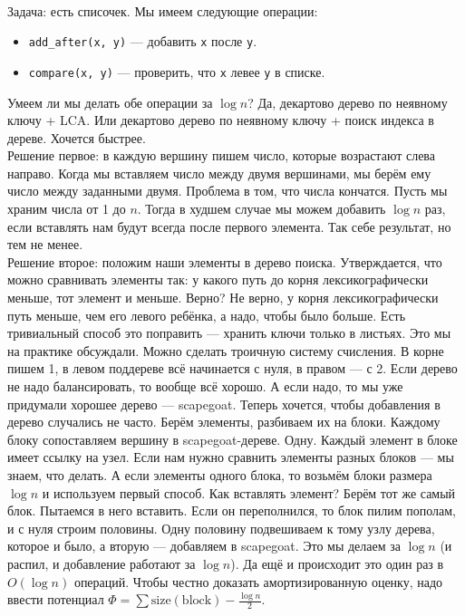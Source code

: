 \documentclass{article}
\newcommand{\pseudo}{PseudoLexer.py:PseudoLexer -x}
\newcommand{\pseudocode}[1]{\texttt{#1}}
\begin{document}
    \paragraph{}
    Задача: есть списочек. Мы имеем следующие операции:
    \begin{itemize}
        \item \pseudocode{add_after(x, y)} --- добавить \pseudocode{x} после \pseudocode{y}.
        \item \pseudocode{compare(x, y)} --- проверить, что \pseudocode{x} левее \pseudocode{y} в списке.
    \end{itemize}
    Умеем ли мы делать обе операции за $\log n$? Да, декартово дерево по неявному ключу + LCA. Или декартово дерево по неявному ключу + поиск индекса в дереве. Хочется быстрее.\\
    Решение первое: в каждую вершину пишем число, которые возрастают слева направо. Когда мы вставляем число между двумя вершинами, мы берём ему число между заданными двумя. Проблема в том, что числа кончатся. Пусть мы храним числа от 1 до $n$. Тогда в худшем случае мы можем добавить $\log n$ раз, если вставлять нам будут всегда после первого элемента. Так себе результат, но тем не менее.\\
    Решение второе: положим наши элементы в дерево поиска. Утверждается, что можно сравнивать элементы так: у какого путь до корня лексикографически меньше, тот элемент и меньше. Верно? Не верно, у корня лексикографически путь меньше, чем его левого ребёнка, а надо, чтобы было больше. Есть тривиальный способ это поправить --- хранить ключи только в листьях. Это мы на практике обсуждали. Можно сделать троичную систему счисления. В корне пишем 1, в левом поддереве всё начинается с нуля, в правом --- с 2. Если дерево не надо балансировать, то вообще всё хорошо. А если надо, то мы уже придумали хорошее дерево --- scapegoat. Теперь хочется, чтобы добавления в дерево случались не часто. Берём элементы, разбиваем их на блоки. Каждому блоку сопоставляем вершину в scapegoat-дереве. Одну. Каждый элемент в блоке имеет ссылку на узел. Если нам нужно сравнить элементы разных блоков --- мы знаем, что делать. А если элементы одного блока, то возьмём блоки размера $\log n$ и используем первый способ. Как вставлять элемент? Берём тот же самый блок. Пытаемся в него вставить. Если он переполнился, то блок пилим пополам, и с нуля строим половины. Одну половину подвешиваем к тому узлу дерева, которое и было, а вторую --- добавляем в scapegoat. Это мы делаем за $\log n$ (и распил, и добавление работают за $\log n$). Да ещё и происходит это один раз в $O(\log n)$ операций. Чтобы честно доказать амортизированную оценку, надо ввести потенциал $\Phi=\sum\mathrm{size(block)}-\frac{\log n}2$.
\end{document}
